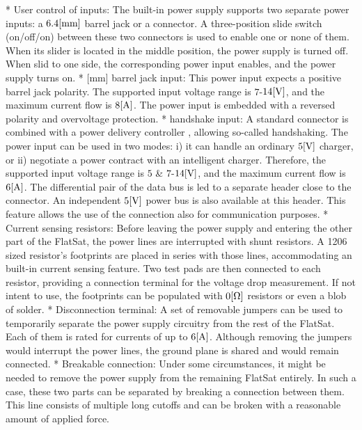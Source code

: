 \begitems
    * {\sbf User control of inputs:} The built-in power supply supports two separate power inputs: a $6.4\rm{[mm]}$ barrel jack or a  connector. A three-position slide switch (on/off/on) between these two connectors is used to enable one or none of them. When its slider is located in the middle position, the power supply is turned off. When slid to one side, the corresponding power input enables, and the power supply turns on.
    * {[mm] barrel jack input:} This power input expects a positive barrel jack polarity. The supported input voltage range is $7$-$14\rm{[V]}$, and the maximum current flow is $8\rm{[A]}$. The power input is embedded with a reversed polarity and overvoltage protection.
    * {\sbf {} handshake input:} A standard  connector is combined with a power delivery controller , allowing so-called handshaking. The power input can be used in two modes: i) it can handle an ordinary $5\rm{[V]}$  charger, or ii) negotiate a power contract with an intelligent  charger. Therefore, the supported input voltage range is $5$ \& $7$-$14\rm{[V]}$, and the maximum current flow is $6\rm{[A]}$.  The differential pair of the  data bus is led to a separate header close to the connector. An independent $5\rm{[V]}$ power bus is also available at this header. This feature allows the use of the  connection also for communication purposes.
    * {\sbf Current sensing resistors:} Before leaving the power supply and entering the other part of the FlatSat, the power lines are interrupted with shunt resistors. A 1206 sized  resistor's footprints are placed in series with those lines, accommodating an built-in current sensing feature. Two test pads are then connected to each resistor, providing a connection terminal for the voltage drop measurement. If not intent to use, the footprints can be populated with $0\rm{[\Omega]}$ resistors or even a blob of solder.
    * {\sbf Disconnection terminal:} A set of removable jumpers can be used to temporarily separate the power supply circuitry from the rest of the FlatSat. Each of them is rated for currents of up to $6\rm{[A]}$. Although removing the jumpers would interrupt the power lines, the ground plane is shared and  would remain connected.
    * {\sbf Breakable connection:} Under some circumstances, it might be needed to remove the power supply from the remaining FlatSat entirely. In such a case, these two parts can be separated by breaking a connection between them. This line consists of multiple long cutoffs and can be broken with a reasonable amount of applied force.
